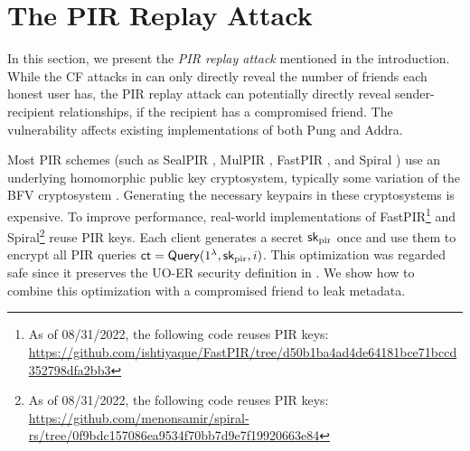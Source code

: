 \section{The PIR Replay Attack}
\label{sec:security-vulnerable}

In this section, we present the \textit{PIR replay attack} mentioned in the introduction. While the CF attacks in \cite{angel2018cf} can only directly reveal the number of friends each honest user has, the PIR replay attack can potentially directly reveal sender-recipient relationships, if the recipient has a compromised friend. The vulnerability affects existing implementations of both Pung and Addra.

Most PIR schemes (such as SealPIR \cite{angel2018pir}, MulPIR \cite{ali2021communicationcomputation}, FastPIR \cite{ahmad2021addra}, and Spiral \cite{wu2022spiral}) use an underlying homomorphic public key cryptosystem, typically some variation of the BFV cryptosystem \cite{fan2012somewhat}. Generating the necessary keypairs in these cryptosystems is expensive. To improve performance, real-world implementations of FastPIR\footnote{As of 08/31/2022, the following code reuses PIR keys: \url{https://github.com/ishtiyaque/FastPIR/tree/d50b1ba4ad4de64181bce71bccd352798dfa2bb3}} and Spiral\footnote{As of 08/31/2022, the following code reuses PIR keys: \url{https://github.com/menonsamir/spiral-rs/tree/0f9bdc157086ea9534f70bb7d9e7f19920663e84}} reuse PIR keys. Each client generates a secret ${\mathsf{sk}}_{\text{pir}}$ once and use them to encrypt all PIR queries $\mathsf{ct} = \mathsf{Query}(1^{\lambda}, {\mathsf{sk}}_{\text{pir}}, i)$. This optimization was regarded safe since it preserves the UO-ER security definition in \cite[Extended Version]{angel2016unobservable}. We show how to combine this optimization with a compromised friend to leak metadata.

